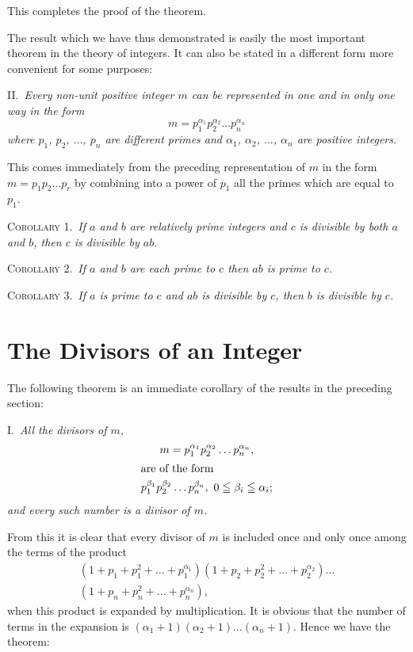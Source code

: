\documentclass[oneside]{book}
\begin{document}
This completes the proof of the theorem.

\smallskip The result which we have thus demonstrated is easily the
most important theorem in the theory of integers. It can also be
stated in a different form more convenient for some purposes:

\smallskip II.~\emph{Every non-unit positive integer $m$ can be
represented in one and in only one way in the form
\begin{equation*}
m = p_1^{\alpha_1} p_2^{\alpha_2} \ldots p_n^{\alpha_n}
\end{equation*}
where $p_1$, $p_2$, $\ldots$, $p_n$ are different primes and
$\alpha_1$, $\alpha_2$, $\ldots$, $\alpha_n$ are positive integers.}%

This comes immediately from the preceding representation of $m$ in
the form $m = p_1 p_2 \ldots p_r$ by combining into a power of $p_1$
all the primes which are equal to $p_1$.

\smallskip \textsc{Corollary 1.}~\emph{If $a$ and $b$ are relatively
prime integers and $c$ is divisible by both $a$ and $b$, then $c$ is
divisible by $ab$.}

\smallskip \textsc{Corollary 2.}~\emph{If $a$ and $b$ are each prime
to $c$ then $ab$ is prime to $c$.}

\smallskip \textsc{Corollary 3.}~\emph{If $a$ is prime to $c$ and
$ab$ is divisible by $c$, then $b$ is divisible by $c$.}

\section{The Divisors of an Integer}\label{s8}%

The following theorem is an immediate corollary of the results in
the preceding section:

I.~\emph{All the divisors of $m$,
\begin{gather*}
m = p_1^{\alpha_1} p_2^{\alpha_2} \ldots p_n^{\alpha_n}, \\
\intertext{are of the form}
p_1^{\beta_1} p_2^{\beta_2} \ldots p_n^{\beta_n},\
   0 \leqq \beta_i \leqq \alpha_i;
\end{gather*}
and every such number is a divisor of $m$.}

From this it is clear that every divisor of $m$ is included once and
only once among the terms of the product
\begin{multline*}
(1 + p_1 + p_1^2 + \ldots + p_1^{\alpha_1})(1 + p_2 + p_2^2 + \ldots
  + p_2^{\alpha_2}) \ldots \\
(1 + p_n + p_n^2 + \ldots + p_n^{\alpha_n}),
\end{multline*}
when this product is expanded by multiplication. It is obvious that
the number of terms in the expansion is $(\alpha_1 + 1)(\alpha_2 +
1) \ldots (\alpha_n+1)$. Hence we have the theorem:
\end{document}
